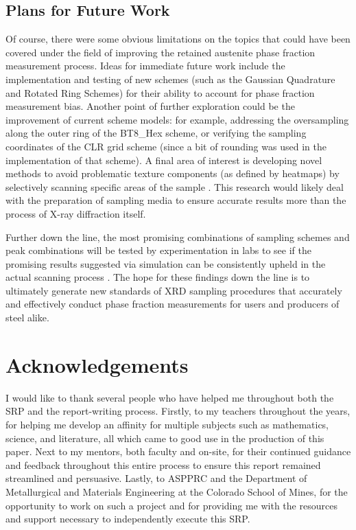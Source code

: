 \documentclass[10pt]{article}
\begin{document}
\subsection{Plans for Future Work}
Of course, there were some obvious limitations on the topics that could have been covered under the 
field of improving the retained austenite phase fraction measurement process. Ideas for immediate future work include the implementation and
testing of new schemes (such as the Gaussian Quadrature and Rotated Ring Schemes) for their ability to account for phase fraction measurement 
bias. Another point of further exploration could be the improvement of current scheme models: for example, addressing the oversampling along 
the outer ring of the BT8\_Hex scheme, or verifying the sampling coordinates of the CLR grid scheme (since a bit of rounding was used in the implementation of 
that scheme). A final area of interest is developing novel methods to avoid problematic texture components (as defined by heatmaps) by selectively scanning 
specific areas of the sample \cite{ref14}. This research would likely deal with the preparation of sampling media to ensure accurate results more than the 
process of X-ray diffraction itself.

Further down the line, the most promising combinations of sampling schemes and peak combinations will be tested by 
experimentation in labs 
to see if the promising results suggested via simulation can be consistently upheld in the actual scanning process \cite{ref14}. The hope for these 
findings down the line is to ultimately generate new standards of XRD sampling procedures that accurately and effectively 
conduct phase fraction measurements for users and producers of steel alike.



\section{Acknowledgements}
I would like to thank several people who have helped me throughout both the SRP and the report-writing process. Firstly, to my teachers 
throughout the years, for helping me develop an affinity for multiple subjects such as mathematics, science, and literature, all which 
came to good use in the production of this paper. Next to my mentors, both faculty and on-site, for their continued guidance
and feedback throughout this entire process to ensure this report remained streamlined and persuasive. Lastly, to ASPPRC and the Department of 
Metallurgical and Materials Engineering at the Colorado School of Mines, for the opportunity to work on such a project and for providing me
with the resources and support necessary to independently execute this SRP.


\end{document}
